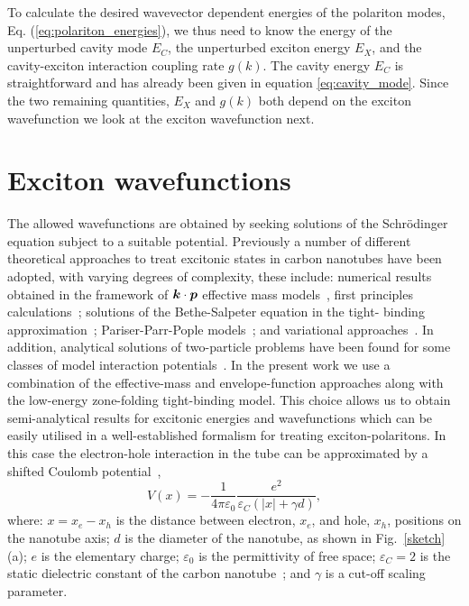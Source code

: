 \documentclass[journal=aamick,manuscript=article]{achemso}
\renewcommand{\vec}[1]{\mbox{\mathversion{bold}$#1$}}
\begin{document}
To calculate the desired wavevector dependent energies of the polariton modes, Eq. (\ref{eq:polariton_energies}), we thus need to know the energy of the unperturbed cavity mode $E_C$, the unperturbed exciton energy $E_X$, and the cavity-exciton interaction coupling rate $g(k)$.
The cavity energy $E_C$ is straightforward and has already been given in equation \ref{eq:cavity_mode}. Since the two remaining quantities, $E_X$ and $g(k)$ both depend on the exciton wavefunction we look at the exciton wavefunction next.\\

\section*{Exciton wavefunctions}
The allowed wavefunctions are obtained by seeking solutions of the Schr\"{o}dinger equation subject to a suitable potential.
Previously a number of different theoretical approaches to treat excitonic states in carbon nanotubes have been adopted, with varying degrees of complexity, these include: numerical results obtained in the framework of $\vec{k}\cdot \vec{p}$ effective mass models~\cite{Ando1997,Kane2003,Kane2004,Ando2006c,Uryu2007,Ando2009}, first principles calculations~\cite{Chang2004,Spataru2004,Spataru2005}; solutions of the Bethe-Salpeter equation in the tight- binding approximation~\cite{Perebeinos2004,Perebeinos2005,Jiang2007}; Pariser-Parr-Pople models~\cite{Zhao2004}; and variational approaches~\cite{Pedersen2003,Maultzsch2005}.
In addition, analytical solutions of two-particle problems have been found for some classes of model interaction potentials~\cite{Hartmann2011,Downing2014a}. 
In the present work we use a combination of the effective-mass and envelope-function approaches along with the low-energy zone-folding tight-binding model.
This choice allows us to obtain semi-analytical results for excitonic energies and wavefunctions which can be easily utilised in a well-established formalism for treating exciton-polaritons.
In this case the electron-hole interaction in the tube can be approximated by a shifted Coulomb potential~\cite{Loudon1959,Wang2005},
%
\begin{equation}
\label{eq:CoulombPotential}
V(x)=-\frac{1}{4\pi\varepsilon_0}\frac{e^2}{\varepsilon_C (|x|+ \gamma d)},
\end{equation}
%
where: $x = x_e - x_h$ is the distance between electron, $x_e$, and hole, $x_h$, positions on the nanotube axis; $d$ is the diameter of the nanotube, as shown in Fig.~\ref{sketch}(a); $e$ is the elementary charge; $\varepsilon_0$ is the permittivity of free space; $\varepsilon_C =2$ is the static dielectric constant of the carbon nanotube~\cite{Zhao2004,Jiang2007}; and $\gamma$ is a cut-off scaling parameter.
\end{document}
